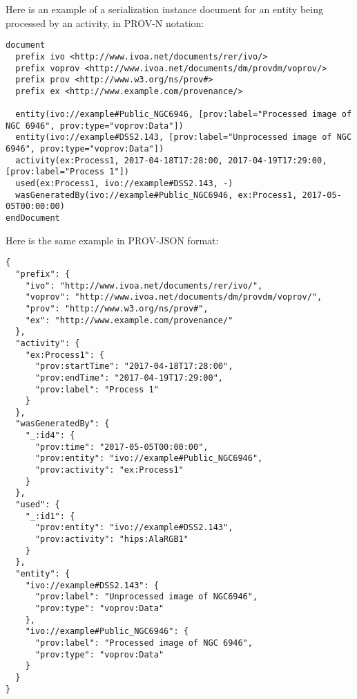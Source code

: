 
Here is an example of a serialization instance document for an entity being processed by an activity, in PROV-N notation:

\begin{verbatim}
document
  prefix ivo <http://www.ivoa.net/documents/rer/ivo/>
  prefix voprov <http://www.ivoa.net/documents/dm/provdm/voprov/>
  prefix prov <http://www.w3.org/ns/prov#>
  prefix ex <http://www.example.com/provenance/>

  entity(ivo://example#Public_NGC6946, [prov:label="Processed image of NGC 6946", prov:type="voprov:Data"])
  entity(ivo://example#DSS2.143, [prov:label="Unprocessed image of NGC 6946", prov:type="voprov:Data"])
  activity(ex:Process1, 2017-04-18T17:28:00, 2017-04-19T17:29:00, [prov:label="Process 1"])
  used(ex:Process1, ivo://example#DSS2.143, -)
  wasGeneratedBy(ivo://example#Public_NGC6946, ex:Process1, 2017-05-05T00:00:00)
endDocument
\end{verbatim}

\noindent
Here is the same example in PROV-JSON format:

\begin{verbatim}
{
  "prefix": {
    "ivo": "http://www.ivoa.net/documents/rer/ivo/",
    "voprov": "http://www.ivoa.net/documents/dm/provdm/voprov/",
    "prov": "http://www.w3.org/ns/prov#",
    "ex": "http://www.example.com/provenance/"
  },
  "activity": {
    "ex:Process1": {
      "prov:startTime": "2017-04-18T17:28:00",
      "prov:endTime": "2017-04-19T17:29:00",
      "prov:label": "Process 1"
    }
  },
  "wasGeneratedBy": {
    "_:id4": {
      "prov:time": "2017-05-05T00:00:00",
      "prov:entity": "ivo://example#Public_NGC6946",
      "prov:activity": "ex:Process1"
    }
  },
  "used": {
    "_:id1": {
      "prov:entity": "ivo://example#DSS2.143",
      "prov:activity": "hips:AlaRGB1"
    }
  },
  "entity": {
    "ivo://example#DSS2.143": {
      "prov:label": "Unprocessed image of NGC6946",
      "prov:type": "voprov:Data"
    },
    "ivo://example#Public_NGC6946": {
      "prov:label": "Processed image of NGC 6946",
      "prov:type": "voprov:Data"
    }
  }
}
\end{verbatim}

